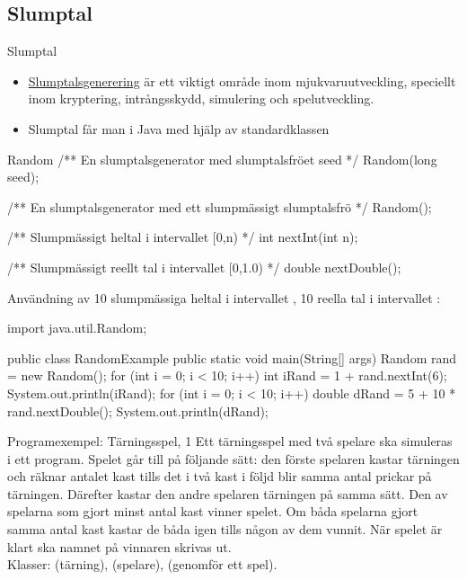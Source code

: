 \documentclass{lecturenotes}
\begin{document}

\subsection{Slumptal}
\begin{Slide}{Slumptal} \footnotesize
\begin{itemize}
\item \href{https://sv.wikipedia.org/wiki/Slumptalsgenerator}{Slumptalsgenerering} är ett viktigt område inom mjukvaruutveckling, speciellt inom kryptering, intrångsskydd, simulering och spelutveckling.
\item Slumptal får man i Java med hjälp av standardklassen \href{http://docs.oracle.com/javase/8/docs/api/java/util/Random.html}{}
\end{itemize}

\begin{ClassSpec}{Random}
/** En slumptalsgenerator med slumptalsfröet seed */
Random(long seed);

/** En slumptalsgenerator med ett slumpmässigt 
    slumptalsfrö */
Random();

/** Slumpmässigt heltal i intervallet [0,n) */
int nextInt(int n);

/** Slumpmässigt reellt tal i intervallet [0,1.0) */
double nextDouble();
\end{ClassSpec}
\end{Slide} 

\begin{Slide}
{Användning av }
10 slumpmässiga heltal i intervallet \code{[1, 6]}, 10 reella tal i intervallet \code{[5.0,~15.0)}:

\begin{Code}
import java.util.Random;

public class RandomExample {
    public static void main(String[] args) {
        Random rand = new Random();
        for (int i = 0; i < 10; i++) {
            int iRand = 1 + rand.nextInt(6);
            System.out.println(iRand);
        }
        for (int i = 0; i < 10; i++) {
            double dRand = 5 + 10 * rand.nextDouble();
            System.out.println(dRand);
        }
    }
}
\end{Code}
\end{Slide} 

\begin{Slide}
{Programexempel: Tärningsspel, 1}
Ett tärningsspel med två spelare ska simuleras i ett program. Spelet går till på följande sätt: den förste spelaren kastar tärningen och räknar antalet kast tills det i två kast i följd blir samma antal prickar på tärningen. Därefter kastar den andre spelaren tärningen på samma sätt. Den av spelarna som gjort minst antal kast vinner spelet. Om båda spelarna gjort samma antal kast kastar de båda igen tills någon av dem vunnit. När spelet är klart ska namnet på vinnaren skrivas ut.\\

Klasser:  (tärning),  (spelare),  (genomför ett spel).
\end{Slide} 
\end{document}

